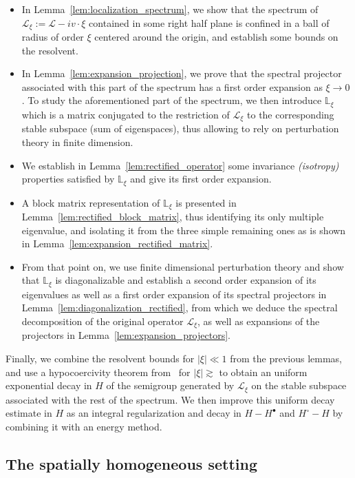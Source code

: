 \documentclass[AHL,Unicode,longabstracts,published]{cedram}
\newcommand{\rectL}{\mathbb{L}}
\newcommand{\LL}{\mathcal{L}}
\newcommand{\Ss}{H}
\newcommand{\Ssp}{H^{\bullet}}
\newcommand{\Ssm}{H^{\circ}}
\begin{document}
\begin{itemize}
\item In Lemma~\ref{lem:localization_spectrum}, we show that the spectrum of $\LL_\xi := \LL - i v \cdot \xi$ contained in some right half plane is confined in a ball of radius of order $\xi$ centered around the origin, and establish some bounds on the resolvent.
\item In Lemma~\ref{lem:expansion_projection}, we prove that the spectral projector associated with this part of the spectrum has a first order expansion as $\xi \to 0$. {To study the aforementioned part of the spectrum, we then introduce $\rectL_{ \xi}$ which is a matrix conjugated to the restriction of $\LL_\xi$ to the corresponding stable subspace (sum of eigenspaces)}, thus allowing to rely on perturbation theory in finite dimension.
\item We establish in Lemma~\ref{lem:rectified_operator} some invariance \emph{(isotropy)} properties satisfied by $\rectL_{ \xi}$ and give its first order expansion.
\item A block matrix representation of $\rectL_{ \xi}$ is presented in Lemma~\ref{lem:rectified_block_matrix}, thus identifying its only multiple eigenvalue, and isolating it from the three simple remaining ones as is shown in Lemma~\ref{lem:expansion_rectified_matrix}.
\item From that point on, we use finite dimensional perturbation theory and show that $\rectL_{ \xi}$ is diagonalizable and establish a second order expansion of its eigenvalues as well as a first order expansion of its spectral projectors in Lemma~\ref{lem:diagonalization_rectified}, from which we deduce the spectral decomposition of the original operator $\LL_\xi$, as well as expansions of the projectors in Lemma~\ref{lem:expansion_projectors}.
\end{itemize}

Finally, we combine the resolvent bounds for $| \xi | \ll 1$ from the previous lemmas, and use a hypocoercivity theorem from~\cite{D2011} for $ | \xi | \gtrsim$ to obtain an uniform exponential decay in $\Ss$ of the semigroup generated by $\LL_\xi$ on the stable subspace associated with the rest of the spectrum. We then improve this uniform decay estimate in $\Ss$ as an {integral regularization and decay in $\Ss-\Ssp$ and $\Ssm-\Ss$} by combining it with an energy method.

\subsection{The spatially homogeneous setting}
\end{document}

